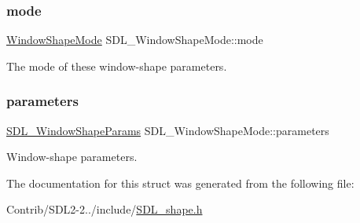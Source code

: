 \subsubsection{\texorpdfstring{mode}{mode}}
{\footnotesize\ttfamily \mbox{\hyperlink{_s_d_l__shape_8h_aa30948f2699e316a43b740eccebe5c20}{Window\+Shape\+Mode}} S\+D\+L\+\_\+\+Window\+Shape\+Mode\+::mode}



The mode of these window-\/shape parameters. 

\mbox{\label{struct_s_d_l___window_shape_mode_a2f79bb294034156207fa6d88d3a8c819}} 
\subsubsection{\texorpdfstring{parameters}{parameters}}
{\footnotesize\ttfamily \mbox{\hyperlink{union_s_d_l___window_shape_params}{S\+D\+L\+\_\+\+Window\+Shape\+Params}} S\+D\+L\+\_\+\+Window\+Shape\+Mode\+::parameters}



Window-\/shape parameters. 



The documentation for this struct was generated from the following file\+:\begin{DoxyCompactItemize}
\item 
Contrib/\+S\+D\+L2-\/2../include/\mbox{\hyperlink{_s_d_l__shape_8h}{S\+D\+L\+\_\+shape.\+h}}\end{DoxyCompactItemize}
